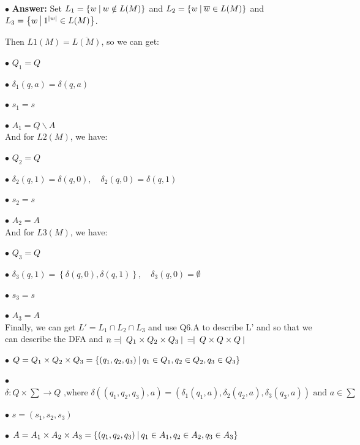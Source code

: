 \documentclass[12pt,a4paper]{article}
\begin{document}
	$\bullet$ \textbf{Answer:}
Set $L_1=\left\{ w \ \vline\ w \notin L(M) \right\}$ and $L_2=\left\{w \ \vline\ \overline{w} \in L(M)\right\}$ and $L_3=\left\{w \ \vline\ 1^{|w|} \in L(M)\right\}$.


	Then $L1(M)=\overline{L(M)}$, so we can get:
	
	$\bullet$ $Q_1 = Q$

	$\bullet$ $\delta_1(q,a) = \delta(q,a) $

	$\bullet$ $s_1 = s$

	$\bullet$ $A_1 = Q \backslash A$\\

	And for $L2(M)$, we have:
	
	$\bullet$ $Q_2 = Q$

	$\bullet$ $\delta_2(q,1) = \delta(q,0), \quad \delta_2(q,0) = \delta(q,1) $

	$\bullet$ $s_2 = s$

	$\bullet$ $A_2 = A$\\

	And for $L3(M)$, we have:
	
	$\bullet$ $Q_3 = Q$

	$\bullet$ $\delta_3(q,1) = \left\{ \delta(q,0),\delta(q,1) \right\}, \quad \delta_3(q,0) = \emptyset $

	$\bullet$ $s_3 = s$

	$\bullet$ $A_3 = A$\\
	
	Finally, we can get $L' = L_1 \cap L_2 \cap L_3$ and use Q6.A to describe L' and so that we can describe the DFA and $n= \vline\ Q_1 \times Q_2 \times Q_3 \   \vline\ = \vline\ Q \times Q \times Q \ \vline\ $
	
	$\bullet$ $Q = Q_1 \times Q_2 \times Q_3 = \{(q_1,q_2,q_3)\ \vline\ q_1 \in Q_1, q_2 \in Q_2, q_3 \in Q_3\}$

	$\bullet$ $\delta:Q \times \sum \rightarrow Q \mbox{ ,where } \delta((q_1,q_2,q_3),a) = (\delta_1(q_1,a),\delta_2(q_2,a),\delta_3(q_3,a)) \mbox{ and } a \in \sum$

	$\bullet$ $s = (s_1,s_2,s_3)$

	$\bullet$ $A = A_1 \times A_2 \times A_3 = \{(q_1,q_2,q_3)\ \vline\ q_1 \in A_1, q_2 \in A_2, q_3 \in A_3\}$
\end{document}
